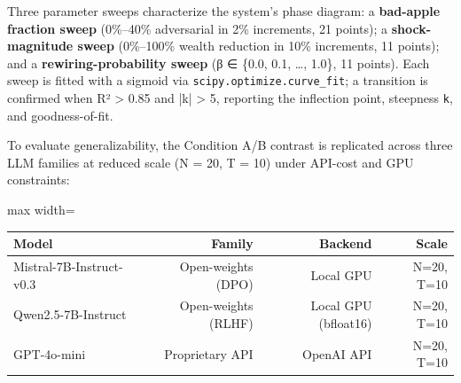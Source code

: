 
Three parameter sweeps characterize the system's phase diagram: a \textbf{bad-apple fraction sweep} (0\%–40\% adversarial in 2\% increments, 21 points); a \textbf{shock-magnitude sweep} (0\%–100\% wealth reduction in 10\% increments, 11 points); and a \textbf{rewiring-probability sweep} (β ∈ \{0.0, 0.1, …, 1.0\}, 11 points). Each sweep is fitted with a sigmoid via \texttt{scipy.optimize.curve\_fit}; a transition is confirmed when R² > 0.85 and |k| > 5, reporting the inflection point, steepness \texttt{k}, and goodness-of-fit.


To evaluate generalizability, the Condition A/B contrast is replicated across three LLM families at reduced scale (N = 20, T = 10) under API-cost and GPU constraints:

\begin{table}[H]
\centering
\footnotesize
\begin{adjustbox}{max width=\textwidth}
\begin{tabular}{lrrr}
\toprule
Model & Family & Backend & Scale \\
\midrule
Mistral-7B-Instruct-v0.3 & Open-weights (DPO) & Local GPU & N=20, T=10 \\
Qwen2.5-7B-Instruct & Open-weights (RLHF) & Local GPU (bfloat16) & N=20, T=10 \\
GPT-4o-mini & Proprietary API & OpenAI API & N=20, T=10 \\
\bottomrule
\end{tabular}
\end{adjustbox}
\end{table}

